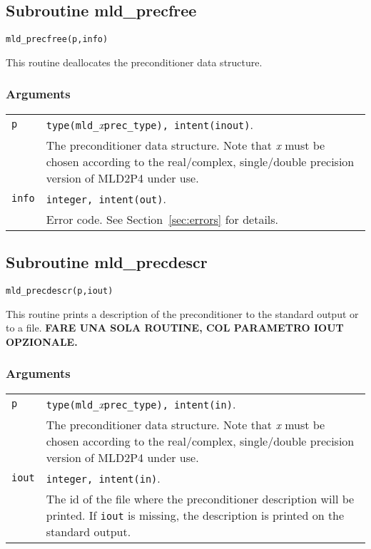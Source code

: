 \subsection{Subroutine mld\_precfree\label{sec:precfree}}

\begin{center}
\verb|mld_precfree(p,info)|\\
\end{center}

\noindent
This routine deallocates the preconditioner data structure.

\subsubsection*{Arguments}

\begin{tabular}{p{1.2cm}p{11.5cm}}
\verb|p|      & \verb|type(mld_|\emph{x}\verb|prec_type), intent(inout)|.\\
              & The preconditioner data structure. Note that \emph{x} must be chosen according
                to the real/complex, single/double precision version of MLD2P4 under use.\\
\verb|info|   & \verb|integer, intent(out)|.\\
              & Error code. See Section~\ref{sec:errors} for details.\\
\end{tabular}


\subsection{Subroutine mld\_precdescr\label{sec:precdescr}}

\begin{center}
\verb|mld_precdescr(p,iout)|\\
\end{center}

\noindent
This routine prints a description of the preconditioner
to the standard output or to a file.
\textbf{FARE UNA SOLA ROUTINE, COL PARAMETRO IOUT OPZIONALE.}

\subsubsection*{Arguments}

\begin{tabular}{p{1.2cm}p{10.6cm}}
\verb|p|      & \verb|type(mld_|\emph{x}\verb|prec_type), intent(in)|.\\
              & The preconditioner data structure. Note that \emph{x} must be chosen according
                to the real/complex, single/double precision version of MLD2P4 under use.\\
\verb|iout|   & \verb|integer, intent(in)|.\\
              & The id of the file where the preconditioner description
                will be printed. If \verb|iout| is missing, the description is printed on
                the standard output.\\
\end{tabular}

